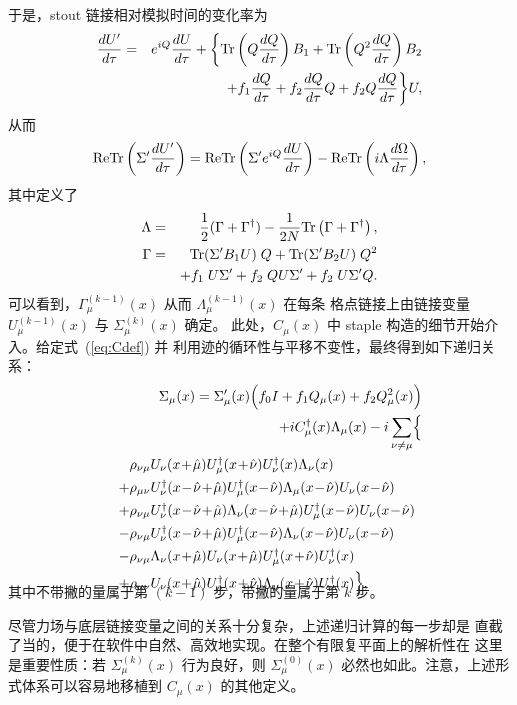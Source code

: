 于是，stout 链接相对模拟时间的变化率为
\begin{eqnarray}
  \frac{dU^\prime}{d\tau} &=& e^{i Q} \frac{dU}{d\tau}
  + \biggl\{  \mbox{Tr}\left(Q\frac{dQ}{d\tau}\right) B_1
   +\mbox{Tr}\left(Q^2\frac{dQ}{d\tau}\right) B_2 \nonumber\\
   &&\qquad + f_1\frac{dQ}{d\tau}+f_2\frac{dQ}{d\tau}Q+f_2Q\frac{dQ}{d\tau}
 \biggr\} U,
\end{eqnarray}
从而
\begin{equation}
\mbox{ReTr}\left(\Sigma^\prime
  \frac{dU^\prime}{d\tau}\right)
 =\mbox{ReTr}\left(\Sigma^\prime e^{i Q} \frac{dU}{d\tau}\right)
                    - \mbox{ReTr}\left(i\Lambda \frac{d\Omega}{d\tau}\right),
   \label{eqn:diff-stouttrace}
\end{equation}
其中定义了
\begin{eqnarray}
   \Lambda &=&
   \frac{1}{2} (\Gamma + \Gamma^\dagger) - \frac{1}{2N}
      \mbox{Tr}\left(\Gamma + \Gamma^\dagger\right), \label{eq:Lambda}\\
  \Gamma &=&
  \mbox{Tr}(\Sigma^\prime B_1 U) \; Q
+ \mbox{Tr}(\Sigma^\prime B_2 U) \; Q^2 \nonumber\\
&&+ f_1  \; U \Sigma^\prime
+ f_2  \; Q U \Sigma^\prime
+ f_2  \; U \Sigma^\prime Q.
\label{eqn:gamma-def}
\end{eqnarray}
可以看到，$\Gamma^{(k-1)}_\mu(x)$ 从而 $\Lambda_\mu^{(k\!-\!1)}(x)$ 在每条
格点链接上由链接变量 $U^{(k-1)}_\mu(x)$ 与 $\Sigma^{(k)}_\mu(x)$ 确定。
此处，$C_\mu(x)$ 中 staple 构造的细节开始介入。给定式~(\ref{eq:Cdef}) 并
利用迹的循环性与平移不变性，最终得到如下递归关系：
\begin{eqnarray}
&&\Sigma_\mu(x) = \Sigma_\mu^\prime(x)
  \Bigl(f_0I+f_1Q_\mu(x)+f_2Q_\mu^2(x)\Bigr)\nonumber\\
   &&+iC^\dagger_\mu(x)\Lambda_\mu(x)  -i
 \displaystyle\sum_{\nu\neq\mu}\Bigl\{
\nonumber\\ &&
 \begin{array}[t]{l}
 \phantom{+} \rho_{\nu\mu}U_\nu(x\!+\!\hat{\mu})
       U^\dagger_\mu(x\!+\!\hat{\nu})U^\dagger_\nu(x)\Lambda_\nu(x) \\[1ex]
 +\rho_{\mu\nu}U^\dagger_\nu(x\!-\!\hat{\nu}\!+\!\hat{\mu})
   U^\dagger_\mu(x\!-\!\hat{\nu})\Lambda_\mu(x\!-\!\hat{\nu})
   U_\nu(x\!-\!\hat{\nu})    \\[1ex]
+\rho_{\nu\mu}U^\dagger_\nu(x\!-\!\hat{\nu}\!+\!\hat{\mu})
  \Lambda_\nu(x\!-\!\hat{\nu}\!+\!\hat{\mu})
  U^\dagger_\mu(x\!-\!\hat{\nu}) U_\nu(x\!-\!\hat{\nu}) \\[1ex]
-\rho_{\nu\mu} U^\dagger_\nu(x\!-\!\hat{\nu}\!+\!\hat{\mu})
 U^\dagger_\mu(x\!-\!\hat{\nu}) \Lambda_\nu(x\!-\!\hat{\nu})
  U_\nu(x\!-\!\hat{\nu}) \\[1ex]
-\rho_{\nu\mu}  \Lambda_\nu(x\!+\!\hat{\mu})U_\nu(x\!+\!\hat{\mu})
   U^\dagger_\mu(x\!+\!\hat{\nu})
   U^\dagger_\nu(x) \\[1ex]
+\rho_{\mu\nu}U_\nu(x\!+\!\hat{\mu})U^\dagger_\mu(x\!+\!\hat{\nu})
 \Lambda_\mu(x\!+\!\hat{\nu})
 U^\dagger_\nu(x)
 \Bigr\},\end{array} \nonumber\\[-6mm]
\label{eq:sigma}
\end{eqnarray}
其中不带撇的量属于第 $(k-1)$ 步，带撇的量属于第 $k$ 步。

尽管力场与底层链接变量之间的关系十分复杂，上述递归计算的每一步却是
直截了当的，便于在软件中自然、高效地实现。在整个有限复平面上的解析性在
这里是重要性质：若 $\Sigma^{(k)}_\mu(x)$ 行为良好，则 $\Sigma^{(0)}_\mu(x)$
必然也如此。注意，上述形式体系可以容易地移植到 $C_\mu(x)$ 的其他定义。
